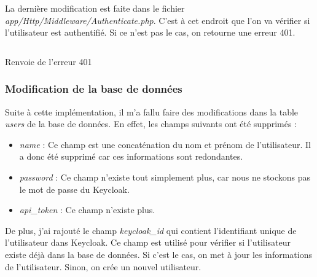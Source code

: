 La dernière modification est faite dans le fichier \emph{app/Http/Middleware/Authenticate.php}. C'est à cet endroit que l'on va vérifier si l'utilisateur est authentifié. Si ce n'est pas le cas, on retourne une erreur 401.

\begin{listing}[H]
    \inputminted{php}{assets/code/authenticate.php}
    \caption{Renvoie de l'erreur 401 \label{authenticate}}
\end{listing}


\subsubsection{Modification de la base de données}
Suite à cette implémentation, il m'a fallu faire des modifications dans la table \emph{users} de la base de données. En effet, les champs suivants ont été supprimés :
\begin{itemize}
    \item \emph{name} : Ce champ est une concaténation du nom et prénom de l'utilisateur. Il a donc été supprimé car ces informations sont redondantes.
    \item \emph{password} : Ce champ n'existe tout simplement plus, car nous ne stockons pas le mot de passe du Keycloak.
    \item \emph{api\_token} : Ce champ n'existe plus.
\end{itemize}

De plus, j'ai rajouté le champ \emph{keycloak\_id} qui contient l'identifiant unique de l'utilisateur dans Keycloak. Ce champ est utilisé pour vérifier si l'utilisateur existe déjà dans la base de données. Si c'est le cas, on met à jour les informations de l'utilisateur. Sinon, on crée un nouvel utilisateur.